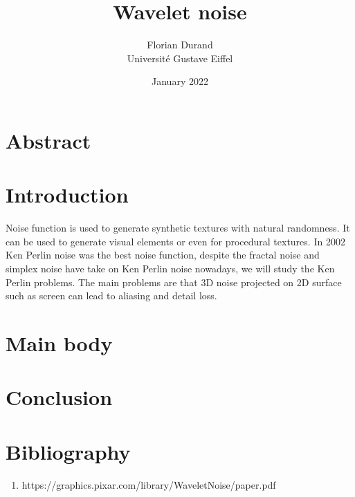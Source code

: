 \documentclass[11pt,a4paper]{article}
\title{Wavelet noise}
\date{January 2022}
\author{Florian Durand \\ Université Gustave Eiffel}
\begin{document}
\maketitle



\section{Abstract}



\section{Introduction}

Noise function is used to generate synthetic textures with natural randomness. It can be used to generate visual elements or even for procedural textures. In 2002 Ken Perlin noise was the best noise function, despite the fractal noise and simplex noise have take on Ken Perlin noise nowadays, we will study the Ken Perlin problems. The main problems are that 3D noise projected on 2D surface such as screen can lead to aliasing and detail loss.

\section{Main body}



\section{Conclusion}



\section{Bibliography}

\begin{enumerate}
\item https://graphics.pixar.com/library/WaveletNoise/paper.pdf
\end{enumerate}
\end{document}
